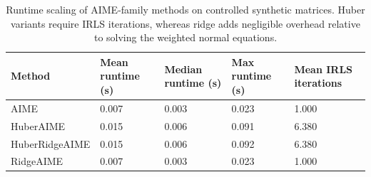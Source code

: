\begin{table}[t]
\centering
\begin{tabular}{lllll}
\toprule
Method & Mean runtime (s) & Median runtime (s) & Max runtime (s) & Mean IRLS iterations \\
\midrule
AIME & 0.007 & 0.003 & 0.023 & 1.000 \\
HuberAIME & 0.015 & 0.006 & 0.091 & 6.380 \\
HuberRidgeAIME & 0.015 & 0.006 & 0.092 & 6.380 \\
RidgeAIME & 0.007 & 0.003 & 0.023 & 1.000 \\
\bottomrule
\end{tabular}

\caption{Runtime scaling of AIME-family methods on controlled synthetic matrices. Huber variants require IRLS iterations, whereas ridge adds negligible overhead relative to solving the weighted normal equations.}
\label{tab:revision_runtime_scaling}
\end{table}